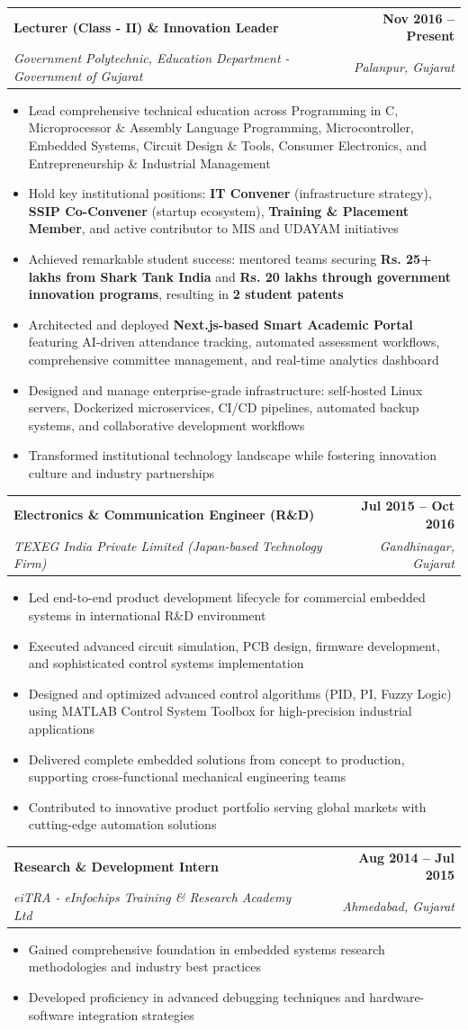 \documentclass[11pt,a4paper]{article}
\makeatletter
\newcommand{\resumeItem}[1]{
    \item\small{#1 \vspace{-1pt}}
}
\newcommand{\resumeSubheading}[4]{
    \vspace{-1pt}\item
    \begin{tabular*}{0.97\textwidth}[t]{l@{\extracolsep{\fill}}r}
        \textbf{\color{secondary}#1} & \textbf{\color{mediumgray}\small #2} \\
        \textit{\small\color{primary}#3} & \textit{\small\color{mediumgray} #4} \\
    \end{tabular*}\vspace{-3pt}
}
\newcommand{\resumeItemListStart}{\begin{itemize}[leftmargin=0.3in]}
\newcommand{\resumeItemListEnd}{\end{itemize}\vspace{-4pt}}
\makeatother
\begin{document}
\resumeSubheading
{Lecturer (Class - II) \& Innovation Leader}{Nov 2016 -- Present}
{Government Polytechnic, Education Department - Government of Gujarat}{Palanpur, Gujarat}
\resumeItemListStart
\resumeItem{Lead comprehensive technical education across Programming in C, Microprocessor \& Assembly Language Programming, Microcontroller, Embedded Systems, Circuit Design \& Tools, Consumer Electronics, and Entrepreneurship \& Industrial Management}
\resumeItem{Hold key institutional positions: \textbf{IT Convener} (infrastructure strategy), \textbf{SSIP Co-Convener} (startup ecosystem), \textbf{Training \& Placement Member}, and active contributor to MIS and UDAYAM initiatives}
\resumeItem{Achieved remarkable student success: mentored teams securing \textbf{Rs. 25+ lakhs from Shark Tank India} and \textbf{Rs. 20 lakhs through government innovation programs}, resulting in \textbf{2 student patents}}
\resumeItem{Architected and deployed \textbf{Next.js-based Smart Academic Portal} featuring AI-driven attendance tracking, automated assessment workflows, comprehensive committee management, and real-time analytics dashboard}
\resumeItem{Designed and manage enterprise-grade infrastructure: self-hosted Linux servers, Dockerized microservices, CI/CD pipelines, automated backup systems, and collaborative development workflows}
\resumeItem{Transformed institutional technology landscape while fostering innovation culture and industry partnerships}
\resumeItemListEnd

\resumeSubheading
{Electronics \& Communication Engineer (R\&D)}{Jul 2015 -- Oct 2016}
{TEXEG India Private Limited (Japan-based Technology Firm)}{Gandhinagar, Gujarat}
\resumeItemListStart
\resumeItem{Led end-to-end product development lifecycle for commercial embedded systems in international R\&D environment}
\resumeItem{Executed advanced circuit simulation, PCB design, firmware development, and sophisticated control systems implementation}
\resumeItem{Designed and optimized advanced control algorithms (PID, PI, Fuzzy Logic) using MATLAB Control System Toolbox for high-precision industrial applications}
\resumeItem{Delivered complete embedded solutions from concept to production, supporting cross-functional mechanical engineering teams}
\resumeItem{Contributed to innovative product portfolio serving global markets with cutting-edge automation solutions}
\resumeItemListEnd

\resumeSubheading
{Research \& Development Intern}{Aug 2014 -- Jul 2015}
{eiTRA - eInfochips Training \& Research Academy Ltd}{Ahmedabad, Gujarat}
\resumeItemListStart
\resumeItem{Gained comprehensive foundation in embedded systems research methodologies and industry best practices}
\resumeItem{Developed proficiency in advanced debugging techniques and hardware-software integration strategies}
\resumeItemListEnd
\end{document}
